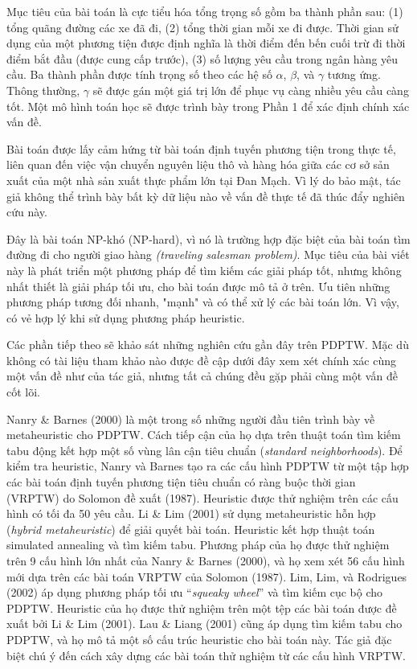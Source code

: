 Mục tiêu của bài toán là cực tiểu hóa tổng trọng số gồm ba thành phần sau: (1) tổng quãng đường các xe đã đi, (2) tổng thời gian mỗi xe đi được. Thời gian sử dụng của một phương tiện được định nghĩa là thời điểm đến bến cuối trừ đi thời điểm bắt đầu (được cung cấp trước), (3) số lượng yêu cầu trong ngân hàng yêu cầu.
Ba thành phần được tính trọng số theo các hệ số $\alpha$, $\beta$, và $\gamma$ tương ứng. Thông thường, $\gamma$ sẽ được gán một giá trị lớn để phục vụ càng nhiều yêu cầu càng tốt. Một mô hình toán học sẽ được trình bày trong Phần 1 để xác định chính xác vấn đề.

Bài toán được lấy cảm hứng từ bài toán định tuyến phương tiện trong thực tế, liên quan đến việc vận chuyển nguyên liệu thô và hàng hóa giữa các cơ sở sản xuất của một nhà sản xuất thực phẩm lớn tại Đan Mạch. Vì lý do bảo mật, tác giả không thể trình bày bất kỳ dữ liệu nào về vấn đề thực tế đã thúc đẩy nghiên cứu này.

Đây là bài toán NP-khó (NP-hard), vì nó là trường hợp đặc biệt của bài toán tìm đường đi cho người giao hàng \textit{(traveling salesman problem)}. Mục tiêu của bài viết này là phát triển một phương pháp để tìm kiếm các giải pháp tốt, nhưng không nhất thiết là giải pháp tối ưu, cho bài toán được mô tả ở trên. Ưu tiên những phương pháp tương đối nhanh, "mạnh" và có thể xử lý các bài toán lớn. Vì vậy, có vẻ hợp lý khi sử dụng phương pháp heuristic.

Các phần tiếp theo sẽ khảo sát những nghiên cứu gần đây trên PDPTW. Mặc dù không có tài liệu tham khảo nào được đề cập dưới đây xem xét chính xác cùng một vấn đề như của tác giả, nhưng tất cả chúng đều gặp phải cùng một vấn đề cốt lõi.

Nanry \& Barnes (2000) là một trong số những người đầu tiên trình bày về metaheuristic cho PDPTW. Cách tiếp cận của họ dựa trên thuật toán tìm kiếm tabu động kết hợp một số vùng lân cận tiêu chuẩn (\textit{standard neighborhoods}). Để kiểm tra heuristic, Nanry và Barnes tạo ra các cấu hình PDPTW từ một tập hợp các bài toán định tuyến phương tiện tiêu chuẩn có ràng buộc thời gian (VRPTW) do Solomon đề xuất (1987). Heuristic được thử nghiệm trên các cấu hình có tối đa 50 yêu cầu. Li \& Lim (2001) sử dụng metaheuristic hỗn hợp (\textit{hybrid metaheuristic}) để giải quyết bài toán. Heuristic kết hợp thuật toán simulated annealing và tìm kiếm tabu. Phương pháp của họ được thử nghiệm trên 9 cấu hình lớn nhất của Nanry \& Barnes (2000), và họ xem xét 56 cấu hình mới dựa trên các bài toán VRPTW của Solomon (1987).
Lim, Lim, và Rodrigues (2002) áp dụng phương pháp tối ưu “\textit{squeaky wheel}” và tìm kiếm cục bộ cho PDPTW. Heuristic của họ được thử nghiệm trên một tệp các bài toán được đề xuất bởi Li \& Lim (2001). Lau \& Liang (2001) cũng áp dụng tìm kiếm tabu cho PDPTW, và họ mô tả một số cấu trúc heuristic cho bài toán này. Tác giả đặc biệt chú ý đến cách xây dựng các bài toán thử nghiệm từ các cấu hình VRPTW.

